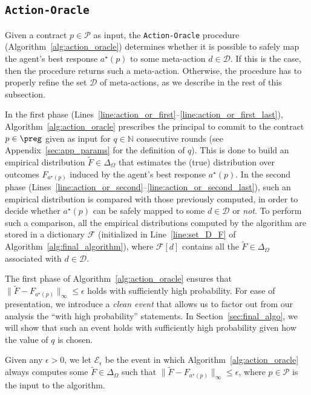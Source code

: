 \subsection{\texttt{Action-Oracle}}\label{sec:action_oracle}
Given a contract $p \in \mathcal{P}$ as input, the \texttt{Action-Oracle} procedure (Algorithm~\ref{alg:action_oracle}) determines whether it is possible to safely map the agent's best response $a^\star(p)$ to some meta-action $d \in \mathcal{D}$.
%
If this is the case, then the procedure returns such a meta-action.
%
%
Otherwise, the procedure has to properly refine the set $\mathcal{D}$ of meta-actions, as we describe in the rest of this subsection.

In the first phase (Lines~\ref{line:action_or_first}--\ref{line:action_or_first_last}), Algorithm~\ref{alg:action_oracle} prescribes the principal to commit to the contract $p \in \preg$ given as input for $q \in \mathbb{N}$ consecutive rounds (see Appendix~\ref{sec:app_params} for the definition of $q$).
%
This is done to build an empirical distribution $\widetilde{F} \in \Delta_{\Omega}$ that estimates the (true) distribution over outcomes $F_{a^\star(p)}$ induced by the agent's best response $a^\star(p)$.
%
In the second phase (Lines~\ref{line:action_or_second}--\ref{line:action_or_second_last}), such an empirical distribution is compared with those previously computed, %
in order to decide whether $a^\star(p)$ can be safely mapped to some $d \in \mathcal{D}$ or \emph{not}.
%
To perform such a comparison, all the empirical distributions computed by the algorithm are stored in a dictionary $\mathcal{F}$ (initialized in Line~\ref{line:set_D_F} of Algorithm~\ref{alg:final_algorithm}), where $\mathcal{F}[d]$ contains all the $\widetilde{F} \in \Delta_{\Omega}$ associated with $d \in \mathcal{D}$.
%
%



The first phase of Algorithm~\ref{alg:action_oracle} ensures that $ \|  \widetilde F - F_{a^\star(p)} \|_{\infty} \le \epsilon $ holds with sufficiently high probability.
%
For ease of presentation, we introduce a \emph{clean event} that allows us to factor out from our analysis the ``with high probability'' statements.
%
In Section~\ref{sec:final_algo}, we will show that such an event holds with sufficiently high probability given how the value of $q$ is chosen.
%
\begin{definition}
	Given any $\epsilon > 0$, we let $\mathcal{E}_\epsilon$ be the event in which Algorithm~\ref{alg:action_oracle} always computes some $\widetilde F \in \Delta_{\Omega}$ such that $ \|\widetilde{F} - F_{a^\star(p)} \|_{\infty} \le \epsilon $, where $p \in \mathcal{P}$ is the input to the algorithm.
\end{definition}


